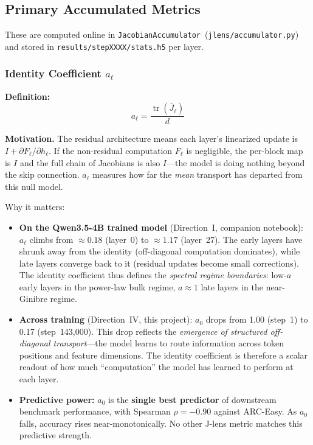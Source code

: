\documentclass[11pt,a4paper]{article}
\begin{document}
\subsection{Primary Accumulated Metrics}

These are computed online in \texttt{JacobianAccumulator}~(\texttt{jlens/accumulator.py}) and stored in \texttt{results/stepXXXX/stats.h5} per layer.

\subsubsection{Identity Coefficient $a_\ell$}
\label{sec:a_coeff}

\textbf{Definition:}
\begin{equation}
  a_\ell = \frac{\operatorname{tr}(\bar{J}_\ell)}{d}
\end{equation}

\textbf{Motivation.} The residual architecture means each layer's linearized update is $I + \partial F_\ell / \partial h_\ell$. If the non-residual computation $F_\ell$ is negligible, the per-block map is $I$ and the full chain of Jacobians is also $I$---the model is doing nothing beyond the skip connection. $a_\ell$ measures how far the \emph{mean} transport has departed from this null model.

Why it matters:
\begin{itemize}
  \item \textbf{On the Qwen3.5-4B trained model} (Direction~I, companion notebook): $a_\ell$ climbs from $\approx 0.18$ (layer~0) to $\approx 1.17$ (layer~27). The early layers have shrunk away from the identity (off-diagonal computation dominates), while late layers converge back to it (residual updates become small corrections). The identity coefficient thus defines the \emph{spectral regime boundaries}: low-$a$ early layers in the power-law bulk regime, $a \approx 1$ late layers in the near-Ginibre regime.
  \item \textbf{Across training} (Direction~IV, this project): $a_0$ drops from 1.00 (step~1) to 0.17 (step~143,000). This drop reflects the \emph{emergence of structured off-diagonal transport}---the model learns to route information across token positions and feature dimensions. The identity coefficient is therefore a scalar readout of how much ``computation'' the model has learned to perform at each layer.
  \item \textbf{Predictive power:} $a_0$ is the \textbf{single best predictor} of downstream benchmark performance, with Spearman $\rho = -0.90$ against ARC-Easy. As $a_0$ falls, accuracy rises near-monotonically. No other J-lens metric matches this predictive strength.
\end{itemize}
\end{document}

